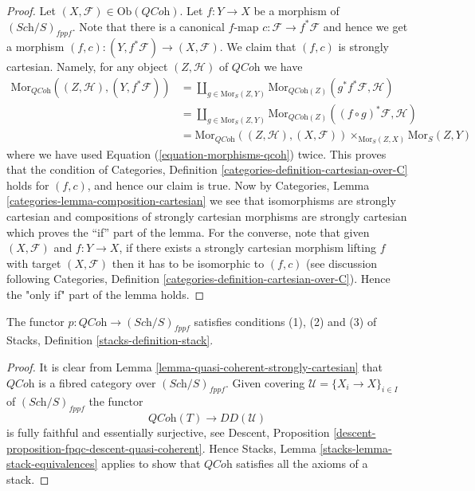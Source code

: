 \begin{proof}
Let $(X, \mathcal{F}) \in \text{Ob}(\textit{QCoh})$.
Let $f : Y \to X$ be a morphism of $(\textit{Sch}/S)_{fppf}$.
Note that there is a canonical $f$-map $c : \mathcal{F} \to f^*\mathcal{F}$
and hence we get a morphism
$(f, c) : (Y, f^*\mathcal{F}) \to (X, \mathcal{F})$.
We claim that $(f, c)$ is strongly cartesian.
Namely, for any object $(Z, \mathcal{H})$ of $\textit{QCoh}$ we have
\begin{align*}
\text{Mor}_{\textit{QCoh}}((Z, \mathcal{H}), (Y, f^*\mathcal{F}))
& =
\coprod\nolimits_{g \in \text{Mor}_S(Z, Y)}
\text{Mor}_{\textit{QCoh}(Z)}(g^*f^*\mathcal{F}, \mathcal{H}) \\
& =
\coprod\nolimits_{g \in \text{Mor}_S(Z, Y)}
\text{Mor}_{\textit{QCoh}(Z)}((f \circ g)^*\mathcal{F}, \mathcal{H}) \\
& =
\text{Mor}_{\textit{QCoh}}((Z, \mathcal{H}), (X, \mathcal{F}))
\times_{\text{Mor}_S(Z, X)} \text{Mor}_S(Z, Y)
\end{align*}
where we have used Equation (\ref{equation-morphisms-qcoh}) twice.
This proves that the condition of
Categories, Definition \ref{categories-definition-cartesian-over-C}
holds for $(f, c)$, and hence our claim is true. Now by
Categories, Lemma \ref{categories-lemma-composition-cartesian}
we see that isomorphisms are strongly cartesian and
compositions of strongly cartesian morphisms are strongly cartesian
which proves the ``if'' part of the lemma. For the converse, note
that given $(X, \mathcal{F})$ and $f : Y \to X$, if there exists a
strongly cartesian morphism lifting $f$ with target $(X, \mathcal{F})$
then it has to be isomorphic to $(f, c)$ (see discussion following
Categories, Definition \ref{categories-definition-cartesian-over-C}).
Hence the "only if" part of the lemma holds.
\end{proof}

\begin{lemma}
\label{lemma-stack-of-quasi-coherent-sheaves}
The functor $p : \textit{QCoh} \to (\textit{Sch}/S)_{fppf}$
satisfies conditions (1), (2) and (3) of
Stacks, Definition \ref{stacks-definition-stack}.
\end{lemma}

\begin{proof}
It is clear from
Lemma \ref{lemma-quasi-coherent-strongly-cartesian}
that $\textit{QCoh}$ is a fibred category over $(\textit{Sch}/S)_{fppf}$.
Given covering $\mathcal{U} = \{X_i \to X\}_{i \in I}$ of
$(\textit{Sch}/S)_{fppf}$ the functor
$$
\textit{QCoh}(T) \longrightarrow DD(\mathcal{U})
$$
is fully faithful and essentially surjective, see
Descent, Proposition \ref{descent-proposition-fpqc-descent-quasi-coherent}.
Hence
Stacks, Lemma \ref{stacks-lemma-stack-equivalences}
applies to show that $\textit{QCoh}$ satisfies all the
axioms of a stack.
\end{proof}





